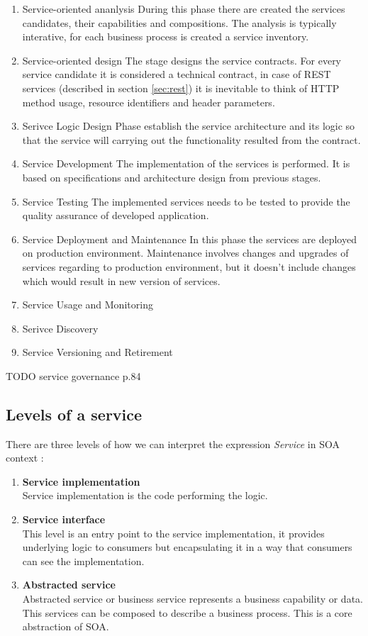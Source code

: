 \begin{enumerate}
  \item Service-oriented ananlysis
  During this phase there are created the services candidates, their capabilities and compositions. The analysis is typically interative, for each business process is created a service inventory.
  \item Service-oriented design
  The stage designs the service contracts. For every service candidate it is considered a technical contract, in case of REST services (described in section \ref{sec:rest}) it is inevitable to think of HTTP method usage, resource identifiers and header parameters.
  \item Serivce Logic Design
  Phase establish the service architecture and its logic so that the service will carrying out the functionality resulted from the contract.
  \item Service Development
  The implementation of the services is performed. It is based on specifications and architecture design from previous stages.
  \item Service Testing
  The implemented services needs to be tested to provide the quality assurance of developed application.
  \item Service Deployment and Maintenance
  In this phase the services are deployed on production environment. Maintenance involves changes and upgrades of services regarding to production environment, but it doesn't include changes which would result in new version of services.
  \item Service Usage and Monitoring
  \item Serivce Discovery
  \item Service Versioning and Retirement
\end{enumerate}

TODO service governance p.84


\subsection{Levels of a service} 
\label{subsec:levels-of-service}

There are three levels of how we can interpret the expression \emph{Service} in SOA context \cite{agile-architecture}:
\begin{enumerate}
  \item \textbf{Service implementation} \hfill \\
Service implementation is the code performing the logic.
  \item \textbf{Service interface} \hfill \\ 
This level is an entry point to the service implementation, it provides underlying logic to consumers but encapsulating it in a way that consumers can see the implementation. 
  \item \textbf{Abstracted service} \hfill \\
Abstracted service or business service represents a business capability or data. This services can be composed to describe a business process. This is a core abstraction of SOA.
\end{enumerate}

